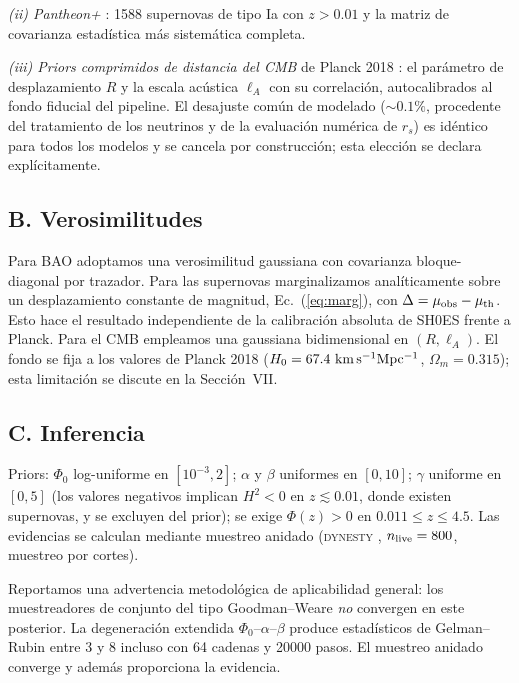 \documentclass[aps,prd,twocolumn,superscriptaddress,nofootinbib,floatfix]{revtex4-2}
\begin{document}
\emph{(ii) Pantheon+} \cite{Scolnic2022}: 1588 supernovas de tipo Ia
con $z>0.01$ y la matriz de covarianza estad\'istica m\'as
sistem\'atica completa.

\emph{(iii) Priors comprimidos de distancia del CMB} de Planck 2018
\cite{Planck2020,Chen2019}: el par\'ametro de desplazamiento $R$ y la
escala ac\'ustica $\ell_A$ con su correlaci\'on, autocalibrados al
fondo fiducial del pipeline. El desajuste com\'un de modelado
($\sim0.1\%$, procedente del tratamiento de los neutrinos y de la
evaluaci\'on num\'erica de $r_s$) es id\'entico para todos los modelos y
se cancela por construcci\'on; esta elecci\'on se declara
expl\'icitamente.

\subsection*{B. Verosimilitudes}

Para BAO adoptamos una verosimilitud gaussiana con covarianza
bloque-diagonal por trazador. Para las supernovas marginalizamos
anal\'iticamente sobre un desplazamiento constante de magnitud,
Ec.~(\ref{eq:marg}), con $\Delta=\mu_{\rm obs}-\mu_{\rm th}$. Esto hace
el resultado independiente de la calibraci\'on absoluta de SH0ES frente
a Planck. Para el CMB empleamos una gaussiana bidimensional en
$(R,\ell_A)$. El fondo se fija a los valores de Planck 2018
($H_0=67.4~{\rm km\,s^{-1}Mpc^{-1}}$, $\Omega_m=0.315$); esta
limitaci\'on se discute en la Secci\'on~VII.

\subsection*{C. Inferencia}

Priors: $\Phi_0$ log-uniforme en $[10^{-3},2]$; $\alpha$ y $\beta$
uniformes en $[0,10]$; $\gamma$ uniforme en $[0,5]$ (los valores
negativos implican $H^2<0$ en $z\lesssim0.01$, donde existen
supernovas, y se excluyen del prior); se exige $\Phi(z)>0$ en
$0.011\le z\le4.5$. Las evidencias se calculan mediante muestreo
anidado (\textsc{dynesty} \cite{Speagle2020}, $n_{\rm live}=800$,
muestreo por cortes).

Reportamos una advertencia metodol\'ogica de aplicabilidad general: los
muestreadores de conjunto del tipo Goodman--Weare \cite{emcee}
\emph{no} convergen en este posterior. La degeneraci\'on extendida
$\Phi_0$--$\alpha$--$\beta$ produce estad\'isticos de Gelman--Rubin
entre 3 y 8 incluso con 64 cadenas y 20000 pasos. El muestreo anidado
converge y adem\'as proporciona la evidencia.
\end{document}
